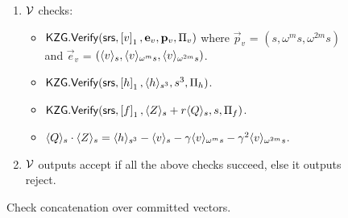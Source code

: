 \begin{figure}[htbp]
\begin{mdframed}
{\begin{enumerate}[leftmargin=1em, label=\arabic*.]
				\item $\verifier$ checks:
				\begin{itemize}[leftmargin=1em, label=-]
					\item $\kzgverify(\srs,\gone{v}, \vec{e}_v, \vec{p}_v, \Pi_v)$ where
					$\vec{p}_v$ = $(s,\omega^m s, \omega^{2m}s)$ and $\vec{e}_v$ = $(\val{s}{v}, \val{\omega^m s}{v}, \val{\omega^{2m} s}{v})$.
					\item $\kzgverify(\srs,\gone{h},  \val{s^3}{h}, s^3,\Pi_h)$.
					\item $\kzgverify(\srs,\gone{f},  \val{s}{Z} + r\val{s}{Q}, s,\Pi_f)$.
					\item $\val{s}{Q}\cdot \val{s}{Z} = \val{s^3}{h}-\val{s}{v}-\gamma \val{\omega^m s}{v}-\gamma^2\val{\omega^{2m}s}{v}$.
				\end{itemize}
				\item $\verifier$ outputs accept if all the above checks succeed, else it outputs reject.
			\end{enumerate}
		}
	\end{mdframed}
	\caption{Check concatenation over committed vectors.}
	\label{fig:concatenation}
\end{figure}


